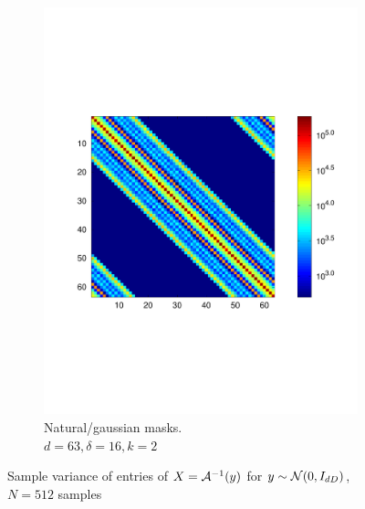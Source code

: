 \begin{figure}
\begin{subfigure}[b]{.49\textwidth}
    \includegraphics[width=\textwidth,trim={.4in 2.5in .8in 2.5in}]{figs/gausvar64}
    \caption{Natural/gaussian masks.\\  $d = 63, \delta = 16, k = 2$}
    \label{fig:gausvar512}
  \end{subfigure}
  \caption{Sample variance of entries of $X = \mathcal{A}^{-1}(y)$ for $y \sim \mathcal{N}(0, I_{dD})$, $N = 512$ samples}
  \label{fig:distvar64}    
\end{figure}
